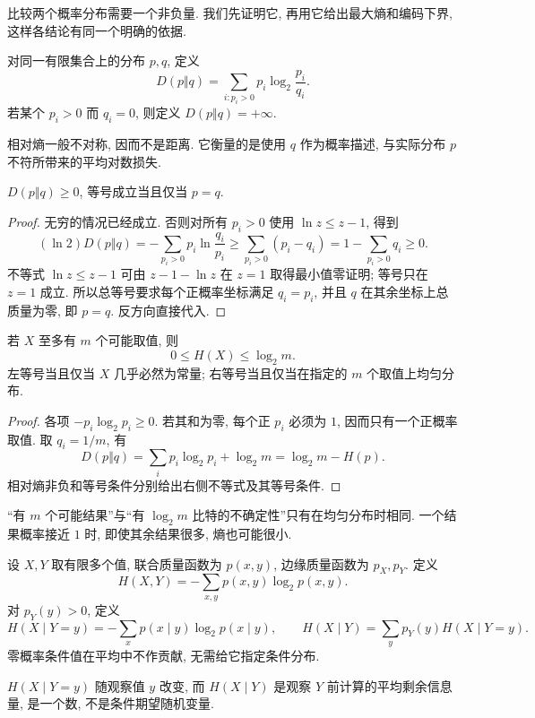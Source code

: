 比较两个概率分布需要一个非负量. 我们先证明它, 再用它给出最大熵和编码下界, 这样各结论有同一个明确的依据.
\begin{definition}[相对熵]
对同一有限集合上的分布 $p,q$, 定义
\[
 D(p\Vert q)=\sum_{i:p_i>0}p_i\log_2\frac{p_i}{q_i}.
\]
若某个 $p_i>0$ 而 $q_i=0$, 则定义 $D(p\Vert q)=+\infty$.
\end{definition}
相对熵一般不对称, 因而不是距离. 它衡量的是使用 $q$ 作为概率描述, 与实际分布 $p$ 不符所带来的平均对数损失.

\begin{lemma}[相对熵非负]
$D(p\Vert q)\geq0$, 等号成立当且仅当 $p=q$.
\end{lemma}
\begin{proof}
无穷的情况已经成立. 否则对所有 $p_i>0$ 使用 $\ln z\leq z-1$, 得到
\[
 (\ln2)D(p\Vert q)
 =-\sum_{p_i>0}p_i\ln\frac{q_i}{p_i}
 \geq\sum_{p_i>0}(p_i-q_i)
 =1-\sum_{p_i>0}q_i\geq0.
\]
不等式 $\ln z\leq z-1$ 可由 $z-1-\ln z$ 在 $z=1$ 取得最小值零证明; 等号只在 $z=1$ 成立. 所以总等号要求每个正概率坐标满足 $q_i=p_i$, 并且 $q$ 在其余坐标上总质量为零, 即 $p=q$. 反方向直接代入.
\end{proof}

\begin{theorem}[有限集合上的最大熵]
若 $X$ 至多有 $m$ 个可能取值, 则
\[
 0\leq H(X)\leq\log_2m.
\]
左等号当且仅当 $X$ 几乎必然为常量; 右等号当且仅当在指定的 $m$ 个取值上均匀分布.
\end{theorem}
\begin{proof}
各项 $-p_i\log_2p_i\geq0$. 若其和为零, 每个正 $p_i$ 必须为 $1$, 因而只有一个正概率取值. 取 $q_i=1/m$, 有
\[
 D(p\Vert q)=\sum_i p_i\log_2p_i+\log_2m=\log_2m-H(p).
\]
相对熵非负和等号条件分别给出右侧不等式及其等号条件.
\end{proof}
“有 $m$ 个可能结果”与“有 $\log_2m$ 比特的不确定性”只有在均匀分布时相同. 一个结果概率接近 $1$ 时, 即使其余结果很多, 熵也可能很小.

\begin{definition}
设 $X,Y$ 取有限多个值, 联合质量函数为 $p(x,y)$, 边缘质量函数为 $p_X,p_Y$. 定义
\[
 H(X,Y)=-\sum_{x,y}p(x,y)\log_2p(x,y).
\]
对 $p_Y(y)>0$, 定义
\[
 H(X\mid Y=y)=-\sum_xp(x\mid y)\log_2p(x\mid y),
 \qquad
 H(X\mid Y)=\sum_yp_Y(y)H(X\mid Y=y).
\]
零概率条件值在平均中不作贡献, 无需给它指定条件分布.
\end{definition}
$H(X\mid Y=y)$ 随观察值 $y$ 改变, 而 $H(X\mid Y)$ 是观察 $Y$ 前计算的平均剩余信息量, 是一个数, 不是条件期望随机变量.

